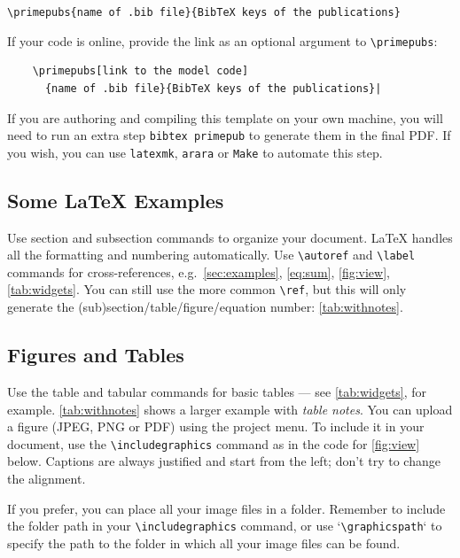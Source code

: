 \documentclass[fleqn,10pt]{physiome}
\begin{document}
\verb|\primepubs{name of .bib file}{BibTeX keys of the publications}|

If your code is online, provide the link as an optional argument to \verb|\primepubs|:

\begin{verbatim}
    \primepubs[link to the model code]
      {name of .bib file}{BibTeX keys of the publications}|
\end{verbatim}

If you are authoring and compiling this template on your own machine, you will need to run an extra step \verb|bibtex primepub| to generate them in the final PDF. If you wish, you can use \texttt{latexmk}, \texttt{arara} or \texttt{Make} to automate this step.

\subsection{Some \LaTeX{} Examples}
\label{sec:examples}

Use section and subsection commands to organize your document. \LaTeX{} handles all the formatting and numbering automatically. Use \verb|\autoref| and \verb|\label| commands for cross-references, e.g.~\autoref{sec:examples}, \autoref{eq:sum}, \autoref{fig:view}, \autoref{tab:widgets}. You can still use the more common \verb|\ref|, but this will only generate the (sub)section/table/figure/equation number: \ref{tab:withnotes}. 

\subsection{Figures and Tables}

Use the table and tabular commands for basic tables --- see \autoref{tab:widgets}, for example. \autoref{tab:withnotes} shows a larger example with \emph{table notes}. You can upload a figure (JPEG, PNG or PDF) using the project menu. To include it in your document, use the \verb|\includegraphics| command as in the code for \autoref{fig:view} below. Captions are always justified and start from the left; don't try to change the alignment.

If you prefer, you can place all your image files in a folder. Remember to include the folder path in your \verb|\includegraphics| command, or use `\verb|\graphicspath|` to specify the path to the folder in which all your image files can be found.
\end{document}
